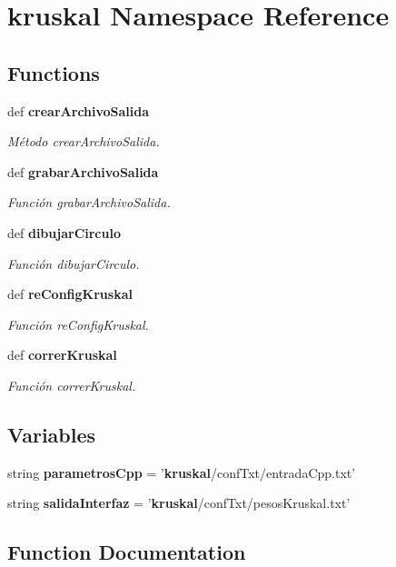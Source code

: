 \section{kruskal Namespace Reference}
\label{namespacekruskal}
\subsection*{Functions}
\begin{DoxyCompactItemize}
\item 
def {\bf crear\+Archivo\+Salida}
\begin{DoxyCompactList}\small\item\em Método crear\+Archivo\+Salida. \end{DoxyCompactList}\item 
def {\bf grabar\+Archivo\+Salida}
\begin{DoxyCompactList}\small\item\em Función grabar\+Archivo\+Salida. \end{DoxyCompactList}\item 
def {\bf dibujar\+Circulo}
\begin{DoxyCompactList}\small\item\em Función dibujar\+Circulo. \end{DoxyCompactList}\item 
def {\bf re\+Config\+Kruskal}
\begin{DoxyCompactList}\small\item\em Función re\+Config\+Kruskal. \end{DoxyCompactList}\item 
def {\bf correr\+Kruskal}
\begin{DoxyCompactList}\small\item\em Función correr\+Kruskal. \end{DoxyCompactList}\end{DoxyCompactItemize}
\subsection*{Variables}
\begin{DoxyCompactItemize}
\item 
string {\bf parametros\+Cpp} = '{\bf kruskal}/conf\+Txt/entrada\+Cpp.\+txt'
\item 
string {\bf salida\+Interfaz} = '{\bf kruskal}/conf\+Txt/pesos\+Kruskal.\+txt'
\end{DoxyCompactItemize}


\subsection{Function Documentation}
